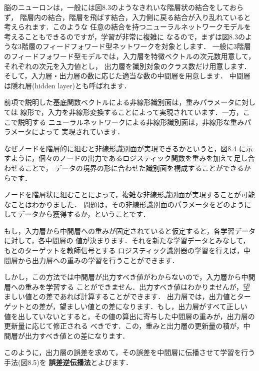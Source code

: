 
脳のニューロンは，一般には図8.3のようなきれいな階層状の結合をしておらず，
階層内の結合，階層を飛ばす結合，入力側に戻る結合が入り乱れていると考えられます．このような
任意の結合を持つニューラルネットワークモデルを考えることもできるのですが，学習が非常に複雑に
なるので，まずは図8.3のような3階層のフィードフォワード型ネットワークを対象とします．
一般に3階層のフィードフォワード型モデルでは，入力層を特徴ベクトルの次元数用意して，それぞれの次元を入力値とし，
出力層を識別対象のクラス数だけ用意します．そして，入力層・出力層の数に応じた適当な数の中間層を用意します．
中間層は隠れ層(hidden layer)とも呼ばれます．


前項で説明した基底関数ベクトルによる非線形識別面は，重みパラメータに対しては
線形で，入力を非線形変換することによって実現されています．一方，ここで説明する
ニューラルネットワークによる非線形識別面は，非線形な重みパラメータによって
実現されています．

なぜノードを階層的に組むと非線形識別面が実現できるかというと，図8.4
に示すように，個々のノードの出力であるロジスティック関数を重みを加えて足し合わせることで，
データの境界の形に合わせた識別面を構成することができるからです．



ノードを階層状に組むことによって，複雑な非線形識別面が実現することが可能なことはわかりました．
問題は，その非線形識別面のパラメータをどのようにしてデータから獲得するか，ということです．

もし，入力層から中間層への重みが固定されていると仮定すると，各学習データに対して，各中間層の
値が決まります．それを新たな学習データとみなして，もとのターゲットを教師信号とする
ロジスティック識別器の学習を行えば，中間層から出力層への重みの学習を行うことができます．

しかし，この方法では中間層が出力すべき値がわからないので，入力層から中間層への重みを学習する
ことができません．出力すべき値はわかりませんが，望ましい値との差であれば計算することができます．
出力層では，出力値とターゲットとの差が，望ましい値との差になります．もし，出力層がすべて正しい
値を出していないとすると，その値の算出に寄与した中間層の重みが，出力層の更新量に応じて修正される
べきです．この，重みと出力層の更新量の積が，中間層が出力すべき値との差になります．

このように，出力層の誤差を求めて，その誤差を中間層に伝播させて学習を行う手法(図8.5)を
{\bf 誤差逆伝播法}とよびます．

